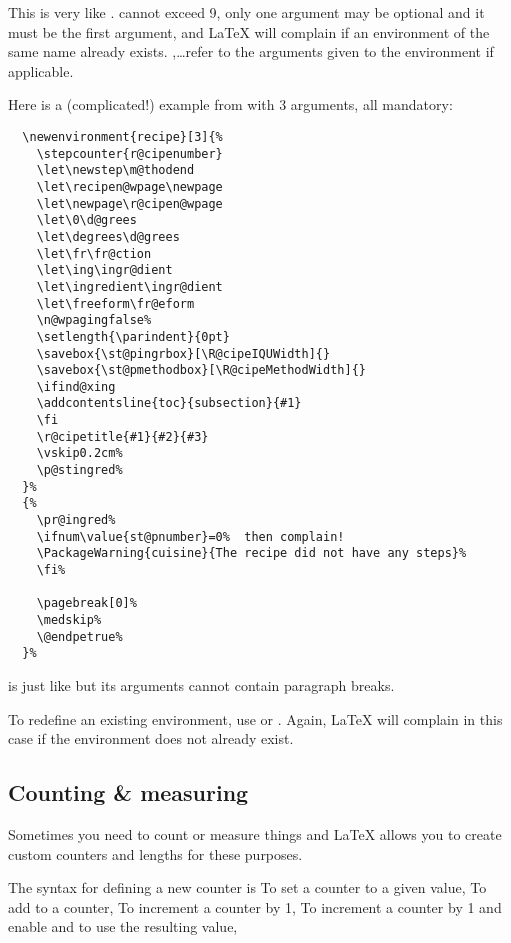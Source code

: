 This is very like .
 cannot exceed 9, only one argument may be optional and it must be the first argument, and \LaTeX{} will complain if an environment of the same name already exists. \narg,\dots \narg[9] refer to the arguments given to the environment if applicable.

Here is a (complicated!) example from  with 3 arguments, all mandatory:

\begin{verbatim}
  \newenvironment{recipe}[3]{%
    \stepcounter{r@cipenumber}
    \let\newstep\m@thodend
    \let\recipen@wpage\newpage
    \let\newpage\r@cipen@wpage
    \let\0\d@grees
    \let\degrees\d@grees
    \let\fr\fr@ction
    \let\ing\ingr@dient
    \let\ingredient\ingr@dient
    \let\freeform\fr@eform
    \n@wpagingfalse%
    \setlength{\parindent}{0pt}
    \savebox{\st@pingrbox}[\R@cipeIQUWidth]{}
    \savebox{\st@pmethodbox}[\R@cipeMethodWidth]{}
    \ifind@xing
    \addcontentsline{toc}{subsection}{#1}
    \fi
    \r@cipetitle{#1}{#2}{#3}
    \vskip0.2cm%
    \p@stingred%
  }%
  {%
    \pr@ingred%
    \ifnum\value{st@pnumber}=0%  then complain!
    \PackageWarning{cuisine}{The recipe did not have any steps}%
    \fi%

    \pagebreak[0]%
    \medskip%
    \@endpetrue%
  }%
\end{verbatim}

 is just like  but its arguments cannot contain paragraph breaks.

To redefine an existing environment, use  or .
Again, \LaTeX{} will complain in this case if the environment does not already exist.

\subsection{Counting \& measuring}\label{subsec:cntmsr}


Sometimes you need to count or measure things and \LaTeX{} allows you to create custom counters and lengths for these purposes.

The syntax for defining a new counter is
To set a counter to a given value,
To add to a counter,
To increment a counter by 1,
To increment a counter by 1 and enable  and  to use the resulting value,

